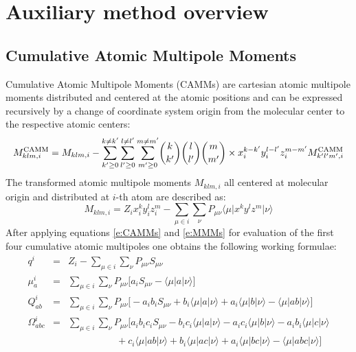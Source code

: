 \documentclass[a4paper,titlepage,twoside,fleqn]{article}
\newcommand{\tbraket}[3]{\ensuremath{\bigl\langle {#1} \bigl\lvert {#2} \bigl\lvert {#3} \bigr\rangle}}
\begin{document}
\section{Auxiliary method overview\label{sec:aux}}
\subsection{Cumulative Atomic Multipole Moments}
Cumulative Atomic Multipole Moments (CAMMs) are  
cartesian atomic multipole moments distributed and centered 
at the atomic positions and can be expressed recursively 
by a change of coordinate system origin from the molecular 
center to the respective atomic centers:
\begin{equation}\label{e:CAMMs}
M_{klm,i}^{\rm CAMM} = M_{klm,i} - {\sum_{k'\ge 0}^{k\ne k'} 
                                    \sum_{l'\ge 0}^{l\ne l'} 
                                    \sum_{m'\ge 0}^{m\ne m'}} {k \choose k'} 
                                                              {l \choose l'} 
                                                              {m \choose m'} \times x_i^{k-k'} y_i^{l-l'} z_i^{m-m'} M_{k'l'm',i}^{\rm CAMM}
\end{equation}
The transformed atomic multipole moments $M_{klm,i}$ all 
centered at molecular origin and distributed at $i$-th atom 
are described as:
\begin{equation}\label{e:MMMs}
M_{klm,i} = Z_ix_i^ky_i^lz_i^m - \sum_{\mu\in i} \sum_{\nu} P_{\mu\nu} \tbraket{\mu}{x^ky^lz^m}{\nu}
\end{equation}
After applying equations \ref{e:CAMMs} and \ref{e:MMMs} 
for evaluation of the first four cumulative atomic multipoles
one obtains the following working formulae:
\begin{eqnarray}
q^i       &=& Z_i - \sum_{\mu\in i} \sum_{\nu} P_{\mu\nu} S_{\mu\nu} \\
\mu_{a}^i &=& \sum_{\mu\in i} \sum_{\nu} P_{\mu\nu} \big[    a_iS_{\mu\nu} -    \tbraket{\mu}{a}{\nu} \big] \\
Q_{ab}^i  &=& \sum_{\mu\in i} \sum_{\nu} P_{\mu\nu} \big[-a_ib_iS_{\mu\nu} + b_i\tbraket{\mu}{a}{\nu} + a_i\tbraket{\mu}{b}{\nu} 
                                                                             - \tbraket{\mu}{ab}{\nu} \big] \\
\Omega_{abc}^i &=& \sum_{\mu\in i} \sum_{\nu} P_{\mu\nu} \big[a_ib_ic_iS_{\mu\nu} - b_ic_i\tbraket{\mu}{a}{\nu} 
                                                                                  - a_ic_i\tbraket{\mu}{b}{\nu} 
                                                                                  - a_ib_i\tbraket{\mu}{c}{\nu} \\\nonumber
                                                               &&\qquad\qquad\quad+ c_i\tbraket{\mu}{ab}{\nu} 
                                                                                  + b_i\tbraket{\mu}{ac}{\nu}
                                                                                  + a_i\tbraket{\mu}{bc}{\nu}
                                                                             - \tbraket{\mu}{abc}{\nu} \big] 
\end{eqnarray} 
\end{document}
